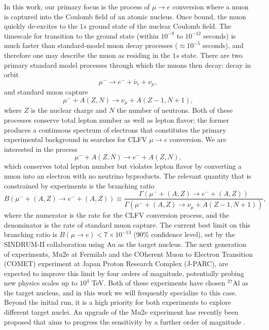\documentclass{book}[letterpaper,12pt]
\begin{document}
In this work, our primary focus is the process of $\mu\rightarrow e$ conversion where a muon is captured into the Coulomb field of an atomic nucleus. 
Once bound, the muon quickly de-excites to the $1s$ ground state of the nuclear Coulomb field. The timescale for transition to the ground state (within $10^{-9}$ to $10^{-12}$ seconds) is much faster than standard-model muon decay processes ($\approx 10^{-5}$ seconds), and therefore one may describe the muon as residing in the $1s$ state. There are two primary standard model processes through which the muons then decay: decay in orbit
\begin{equation}
\mu^-\rightarrow e^- + \bar{\nu}_e+\nu_{\mu},
\end{equation}
and standard muon capture
\begin{equation}
\mu^- + A(Z,N)\rightarrow \nu_{\mu}+A(Z-1,N+1),
\end{equation}
where $Z$ is the nuclear charge and $N$ the number of neutrons. Both of these processes conserve total lepton number as well as lepton flavor; the former produces a continuous spectrum of electrons that constitutes the primary experimental background in searches for CLFV $\mu\rightarrow e$ conversion. We are interested in the process
\begin{equation}
\mu^-+A(Z,N)\rightarrow e^- + A(Z,N),
\end{equation}
which conserves total lepton number but violates lepton flavor  by converting a muon into an electron with no neutrino byproducts. The relevant quantity that is constrained by experiments is the branching ratio
\begin{equation}
B(\mu^-+(A,Z)\rightarrow e^- + (A,Z))\equiv\frac{\Gamma(\mu^-+(A,Z)\rightarrow e^-+(A,Z))}{\Gamma(\mu^-+(A,Z)\rightarrow\nu_{\mu}+A(Z-1,N+1))},
\end{equation}
where the numerator is the rate for the CLFV conversion process, and the denominator is the rate of standard muon capture. The current best limit on this branching ratio is $B(\mu\rightarrow e)<7\times 10^{-13}$ (90\% confidence level), set by the SINDRUM-II collaboration \cite{Bertl2006} using Au as the target nucleus. The next generation of experiments, Mu2e at Fermilab \cite{Bernstein_2019} and the COherent Muon to Electron Transition (COMET) experiment \cite{10.3389/fphy.2018.00133} at Japan Proton Research Complex (J-PARC), are expected to improve this limit by four orders of magnitude, potentially probing new physics scales up to $10^4$ TeV. Both of these experiments have chosen $^{27}$Al as the target nucleus, and in this work we will frequently specialize to this case. Beyond the initial run, it is a high priority for both experiments to explore different target nuclei. An upgrade of the Mu2e experiment has recently been proposed that aims to progress the sensitivity by a further order of magnitude \cite{Mu2e:2018osu}.
\end{document}
